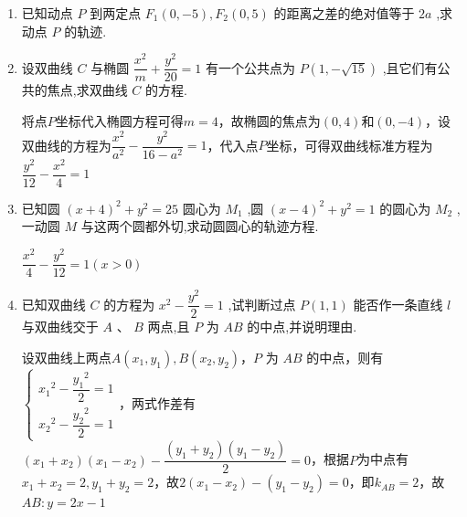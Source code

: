 \begin{enumerate}
    \item 已知动点 $P$ 到两定点 ${F}_{1}\left( {0, - 5}\right) ,{F}_{2}\left( {0,5}\right)$ 的距离之差的绝对值等于 ${2a}$ ,求动点 $P$ 的轨迹.
    \begin{jieda}

    \end{jieda}

    \item 设双曲线 $C$ 与椭圆 $\dfrac{{x}^{2}}{m} + \dfrac{{y}^{2}}{20} = 1$ 有一个公共点为 ${P}\left( {1, - \sqrt{15}}\right)$ ,且它们有公共的焦点,求双曲线 $C$ 的方程.
    \begin{jieda}
        将点$P$坐标代入椭圆方程可得$m = 4$，故椭圆的焦点为$(0, 4)$和$(0, -4)$，设双曲线的方程为$\dfrac{x^2}{a^2}-\dfrac{y^2}{16-a^2} = 1$，代入点$P$坐标，可得双曲线标准方程为$\dfrac{{y}^{2}}{12} - \dfrac{{x}^{2}}{4} = 1$
    \end{jieda}

    \item 已知圆 ${\left( x + 4\right) }^{2} + {y}^{2} = {25}$ 圆心为 ${M}_{1}$ ,圆 ${\left( x - 4\right) }^{2} + {y}^{2} = 1$ 的圆心为 ${M}_{2}$ ,一动圆 ${M}$ 与这两个圆都外切,求动圆圆心的轨迹方程.
    \begin{jieda}
        $\dfrac{{x}^{2}}{4} - \dfrac{{y}^{2}}{12} = 1\left( {x > 0}\right)$
    \end{jieda}

    \item 已知双曲线 ${C}$ 的方程为 ${x}^{2} - \dfrac{{y}^{2}}{2} = 1$ ,试判断过点 $P\left( {1,1}\right)$ 能否作一条直线 $l$ 与双曲线交于 $A\text{ 、 }B$ 两点,且 $P$ 为 ${AB}$ 的中点,并说明理由.
    \begin{jieda}
        设双曲线上两点$A(x_1, y_1), B(x_2, y_2)$，$P$ 为 ${AB}$ 的中点，则有$\left\{\begin{array}{l}
             {x_1}^{2} - \dfrac{{y_1}^{2}}{2} = 1  \\
             {x_2}^{2} - \dfrac{{y_2}^{2}}{2} = 1
        \end{array}\right.$，两式作差有$(x_1+x_2)(x_1-x_2) - \dfrac{(y_1+y_2)(y_1-y_2)}{2} = 0$，根据$P$为中点有$x_1+x_2 = 2, y_1+y_2 = 2$，故$2(x_1-x_2) - (y_1-y_2) = 0$，即$k_{AB} = 2$，故$AB: y = 2x-1$


\end{jieda}
\end{enumerate}
